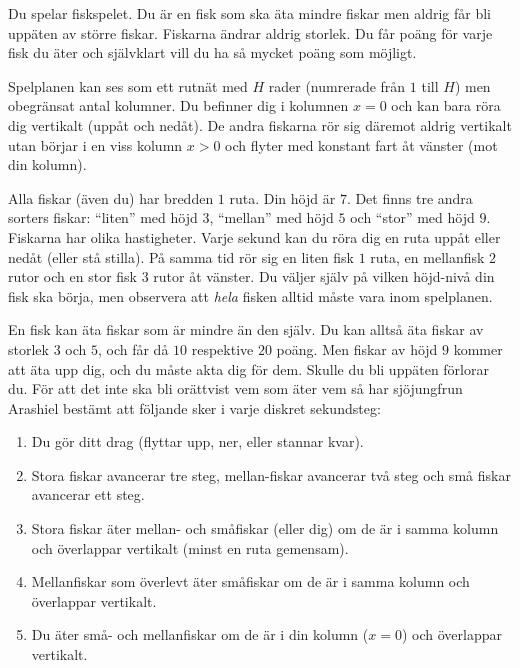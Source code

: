 Du spelar fiskspelet. Du är en fisk som ska äta mindre fiskar men aldrig får
bli uppäten av större fiskar. Fiskarna ändrar aldrig storlek. Du får poäng för varje fisk du äter och självklart vill du ha så mycket
poäng som möjligt.

Spelplanen kan ses som ett rutnät med $H$ rader (numrerade från $1$ till $H$) men obegränsat antal kolumner. Du befinner dig i kolumnen $x=0$ och kan bara röra dig vertikalt (uppåt och nedåt). De andra fiskarna rör sig däremot aldrig vertikalt utan börjar i en viss kolumn $x>0$ och flyter med konstant fart åt vänster (mot din kolumn). 

Alla fiskar (även du) har bredden $1$ ruta. Din höjd är $7$. Det finns tre andra sorters fiskar: ``liten'' med höjd $3$, ``mellan'' med höjd $5$ och ``stor'' med höjd $9$. Fiskarna har olika hastigheter. Varje sekund kan du röra dig en ruta uppåt eller nedåt (eller stå stilla). På samma tid rör sig en liten fisk $1$ ruta, en mellanfisk $2$ rutor och en stor fisk $3$ rutor åt vänster. Du väljer själv på vilken höjd-nivå din fisk ska börja, men observera att \emph{hela} fisken alltid måste vara inom spelplanen. 


En fisk kan äta fiskar som är mindre än den själv. Du kan alltså äta fiskar av storlek $3$ och $5$, och får då $10$ respektive $20$ poäng. Men fiskar av höjd $9$ kommer att äta upp dig, och du måste akta dig för dem. Skulle du bli uppäten förlorar du. För att det inte ska bli orättvist vem som
äter vem så har sjöjungfrun Arashiel bestämt att följande sker i varje diskret
sekundsteg:
\begin{enumerate}
  \item
     Du gör ditt drag (flyttar upp, ner, eller stannar kvar).
  \item
     Stora fiskar avancerar tre steg, mellan-fiskar avancerar två steg och små fiskar avancerar ett steg.
  \item
     Stora fiskar äter mellan- och småfiskar (eller dig) om de är i samma kolumn och överlappar vertikalt (minst en ruta gemensam).
  \item
     Mellanfiskar som överlevt äter småfiskar om de är i samma kolumn och överlappar vertikalt.
  \item
     Du äter små- och mellanfiskar om de är i din kolumn ($x=0$) och överlappar vertikalt.
\end{enumerate}


